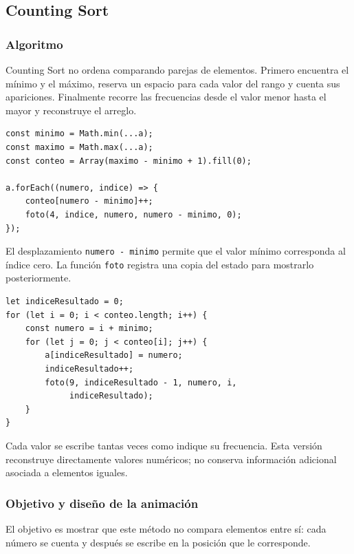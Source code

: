 \documentclass[12pt,a4paper]{article}
\begin{document}
\subsection{Counting Sort}

\subsubsection{Algoritmo}

Counting Sort no ordena comparando parejas de elementos. Primero encuentra el mínimo y el máximo, reserva un espacio para cada valor del rango y cuenta sus apariciones. Finalmente recorre las frecuencias desde el valor menor hasta el mayor y reconstruye el arreglo.

\begin{lstlisting}[caption={Conteo de apariciones en Counting Sort}]
const minimo = Math.min(...a);
const maximo = Math.max(...a);
const conteo = Array(maximo - minimo + 1).fill(0);

a.forEach((numero, indice) => {
    conteo[numero - minimo]++;
    foto(4, indice, numero, numero - minimo, 0);
});
\end{lstlisting}

El desplazamiento \texttt{numero - minimo} permite que el valor mínimo corresponda al índice cero. La función \texttt{foto} registra una copia del estado para mostrarlo posteriormente.

\begin{lstlisting}[caption={Reconstrucción del arreglo ordenado}]
let indiceResultado = 0;
for (let i = 0; i < conteo.length; i++) {
    const numero = i + minimo;
    for (let j = 0; j < conteo[i]; j++) {
        a[indiceResultado] = numero;
        indiceResultado++;
        foto(9, indiceResultado - 1, numero, i,
             indiceResultado);
    }
}
\end{lstlisting}

Cada valor se escribe tantas veces como indique su frecuencia. Esta versión reconstruye directamente valores numéricos; no conserva información adicional asociada a elementos iguales.

\subsubsection{Objetivo y diseño de la animación}

El objetivo es mostrar que este método no compara elementos entre sí: cada número se cuenta y después se escribe en la posición que le corresponde.
\end{document}
